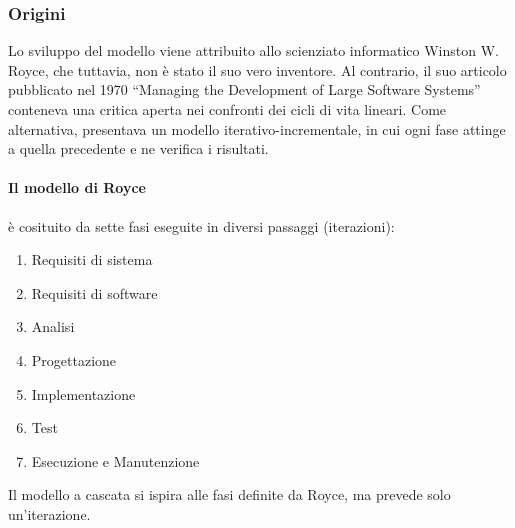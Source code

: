 \subsubsection{Origini}
Lo sviluppo del modello viene attribuito allo scienziato informatico Winston W. Royce, che tuttavia, non è stato il suo vero inventore. Al contrario, il suo articolo pubblicato nel 1970 “Managing the Development of Large Software Systems” \cite{royce:softwaredevelopment} conteneva una critica aperta nei confronti dei cicli di vita lineari. Come alternativa, presentava un modello iterativo-incrementale, in cui ogni fase attinge a quella precedente e ne verifica i risultati. 

\paragraph{Il modello di Royce} è cosituito da sette fasi eseguite in diversi passaggi (iterazioni):

\begin{enumerate}
    \item Requisiti di sistema
    \item Requisiti di software
    \item Analisi
    \item Progettazione
    \item Implementazione
    \item Test
    \item Esecuzione e Manutenzione
\end{enumerate}
Il modello a cascata si ispira alle fasi definite da Royce, ma prevede solo un’iterazione.

